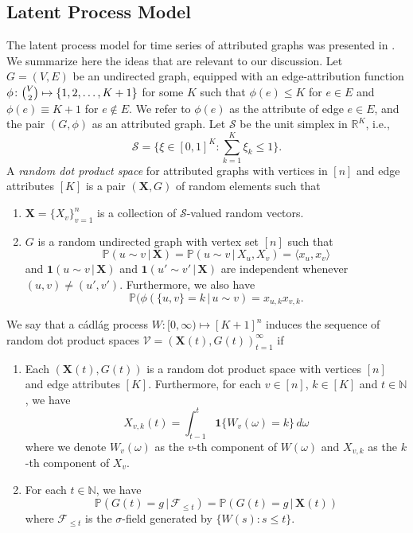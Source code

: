 \documentclass[10pt,journal,compsoc]{IEEEtran}
\theoremstyle{definition}
\begin{document}
\subsection{Latent Process Model}
The latent process model for time series of attributed graphs was
presented in \cite{lee11}. We summarize here the ideas that are
relevant to our discussion.  Let $G = (V,E)$ be an undirected graph,
equipped with an edge-attribution function $\phi \colon \tbinom{V}{2}
\mapsto \{1,2,\dots, K+1\}$ for some $K$ such that $\phi(e) \leq K$
for $e \in E$ and $\phi(e) \equiv K+1$ for $e \not \in E$. We refer to
$\phi(e)$ as the attribute of edge $e \in E$, and the pair $(G,\phi)$
as an attributed graph. Let $\mathscr{S}$ be the unit simplex in
$\mathbb{R}^{K}$, i.e.,
\begin{equation}
  \mathscr{S} = \{ \xi \in [0,1]^{K}
  \colon \sum_{k = 1}^{K} \xi_k \leq 1 \}.
\end{equation}
A {\em random dot product space} for attributed graphs with vertices
in $[n]$ and edge attributes $[K]$ is a pair $(\mathbf{X},G)$ of
random elements such that
\begin{enumerate}
\item $\mathbf{X} = \{X_v\}_{v = 1}^{n}$ is a collection of
  $\mathscr{S}$-valued random vectors.
\item $G$ is a random undirected graph with vertex set $[n]$ such that
  \begin{equation}
    \label{eq:1}
    \mathbb{P}(u \sim v \,|\, \mathbf{X}) = \mathbb{P}(u \sim v \, |
    \, X_u,X_v) = \langle x_u, x_v \rangle
  \end{equation}
  and $\bm{1}(u \sim v \,|\, \mathbf{X})$ and $\bm{1}(u' \sim
  v' \,|\, \mathbf{X})$ are independent whenever $(u,v) \not =
  (u',v')$. Furthermore, we also have 
  \begin{equation*}
    \mathbb{P}(\phi(\{u,v\} = k \, | \, u \sim
    v) = x_{u,k} x_{v,k}. 
  \end{equation*}
\end{enumerate}
We say that a c\'{a}dl\'{a}g process $W \colon [0,\infty) \mapsto
[K+1]^{n}$ induces the sequence of random dot product spaces
$\mathscr{V} = (\mathbf{X}(t), G(t))_{t = 1}^{\infty}$ if
\begin{enumerate}
\item Each $(\mathbf{X}(t), G(t))$ is a random dot product space with
  vertices $[n]$ and edge attributes $[K]$. Furthermore, for each $v
  \in [n]$, $k \in [K]$ and $t \in \mathbb{N}$, we have
  \begin{equation}
    \label{eq:54}
  X_{v,k}(t)  = \int_{t - 1}^{t}{ \mathbf{1}\{W_v(\omega) = k\}\, d\omega}
  \end{equation}
  where we denote $W_{v}(\omega)$ as the $v$-th component of $W(\omega)$ and
  $X_{v,k}$ as the $k$-th component of $X_v$.  
\item  For each $t \in \mathbb{N}$, we have
  \begin{equation}
    \label{eq:2}
    \mathbb{P}(G(t) = g \,|\, \mathscr{F}_{\leq t}) = \mathbb{P}(G(t)
    = g \,|\, \mathbf{X}(t))
  \end{equation}
where $\mathscr{F}_{\leq t}$ is the $\sigma$-field generated by $\{W(s)
  \colon s \leq t\}$.
\end{enumerate}
\end{document}
